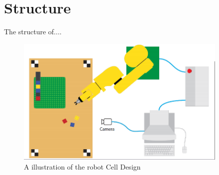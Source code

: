 \chapter{Structure}\label{ch:structure}
The structure of....
\begin{figure}[hb]
  \centering
  \includegraphics[width=4in]{figures/robotCellDesign.png}
  \caption[robot Cell Design]
   {A illustration of the robot Cell Design}
\end{figure}


